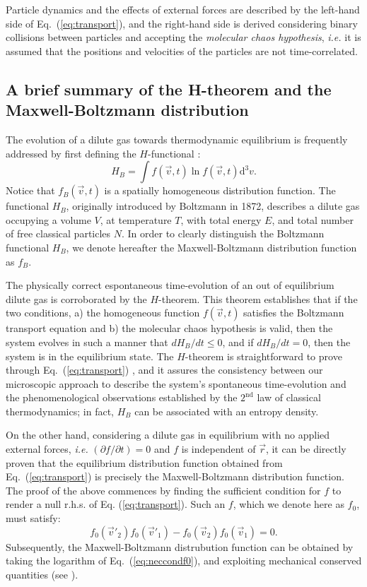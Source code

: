 Particle dynamics and the effects of external forces are described
by the left-hand side of Eq.~(\ref{eq:transport}), and the right-hand side
is derived considering binary collisions between particles and accepting
the \textit{molecular chaos hypothesis}, \textit{i.e.} it is assumed that
the positions and velocities of the particles are not time-correlated.


\subsection{A brief summary of the H-theorem and the Maxwell-Boltzmann distribution}

The evolution of a dilute gas towards thermodynamic equilibrium is frequently
addressed by first defining the $H$-functional \cite{bib:tolman,bib:huang}:
%
\begin{equation}\label{eq:hbfunctional}
   H_{B}=\int f(\vec{v},t) \ln f(\vec{v},t) \mathrm{d}^{3}v.
\end{equation} 
%
Notice that $f_B(\vec{v},t)$ is a spatially homogeneous distribution function.
The functional $H_B$,
originally introduced by Boltzmann in 1872,
describes a dilute gas occupying a volume $V$, at temperature $T$, with total energy $E$, and total
number of free classical particles $N$.
In order to clearly distinguish the Boltzmann functional $H_B$, we denote hereafter
the Maxwell-Boltzmann distribution function as $f_B$.

The physically correct espontaneous time-evolution of an out of equilibrium dilute gas 
is corroborated by the $H$-theorem.
This theorem establishes that if the two conditions, a) the homogeneous
function $f(\vec{v},t)$ satisfies the Boltzmann
transport equation and b) the molecular chaos hypothesis is valid, then
the system evolves in such a manner that $dH_B/dt\leq0$, and if $dH_B/dt=0$, 
then the system is in the equilibrium state. 
The $H$-theorem is straightforward to prove through Eq.~(\ref{eq:transport}) \cite{bib:huang}, 
and it assures the consistency between our microscopic approach to describe the system's spontaneous 
time-evolution and the phenomenological observations
established by the $2^{\textrm{nd}}$ law of classical thermodynamics; in fact,
$H_B$ can be associated with an entropy density.

On the other hand, considering a dilute gas in equilibrium
with no applied external forces, \textit{i.e.}
$(\partial f/\partial t)=0$ and $f$ is independent of $\vec r$, 
it can be directly proven that the equilibrium distribution function obtained from
Eq.~(\ref{eq:transport}) is precisely the Maxwell-Boltzmann
distribution function. The proof of the above commences by finding the sufficient
condition for $f$ to render a null r.h.s. of Eq. (\ref{eq:transport}). Such an
$f$, which we denote here as $f_0$, must satisfy:
%
\begin{equation}\label{eq:neccondf0}
    f_0(\vec{v}'_2)f_0(\vec{v}'_1)- f_0(\vec{v}_2)f_0(\vec{v}_1)=0.
\end{equation}
%
Subsequently, the Maxwell-Boltzmann distrubution function can be obtained by
taking the logarithm of Eq.~(\ref{eq:neccondf0}), and exploiting mechanical
conserved quantities (see \cite[ch. 4.2]{bib:huang}).


